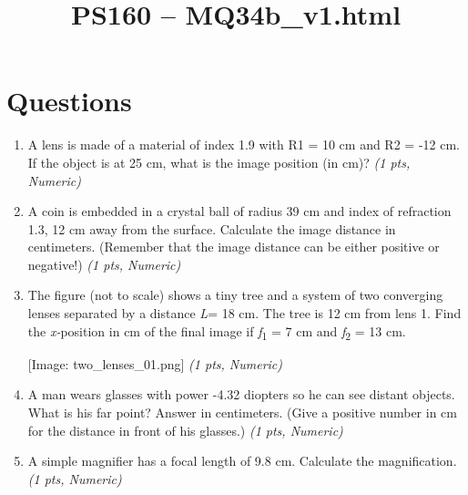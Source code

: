 \documentclass[11pt]{article}
\title{PS160 -- MQ34b\_v1.html}
\date{}
\begin{document}
\maketitle

\section*{Questions}

\begin{enumerate}[leftmargin=*]
  \item A lens is made of a material of index 1.9 with R1 = 10 cm and R2 = -12 cm. If the object is at 25 cm, what is the image position (in cm)? \hfill \textit{(1 pts, Numeric)}

  \item A coin is embedded in a crystal ball of radius 39 cm and index of refraction 1.3, 12 cm away from the surface. Calculate the image distance in centimeters. (Remember that the image distance can be either positive or negative!) \hfill \textit{(1 pts, Numeric)}

  \item The figure (not to scale) shows a tiny tree and a system of two converging lenses separated by a distance \emph{L}= 18 cm. The tree is 12 cm from lens 1. Find the \emph{x-}position in cm of the final image if \emph{f}\textsubscript{1} = 7 cm and \emph{f}\textsubscript{2} = 13 cm.

[Image: two\_lenses\_01.png] \hfill \textit{(1 pts, Numeric)}

  \item A man wears glasses with power -4.32 diopters so he can see distant objects. What is his far point? Answer in centimeters. (Give a positive number in cm for the distance in front of his glasses.) \hfill \textit{(1 pts, Numeric)}

  \item A simple magnifier has a focal length of 9.8 cm. Calculate the magnification. \hfill \textit{(1 pts, Numeric)}

\end{enumerate}
\end{document}

